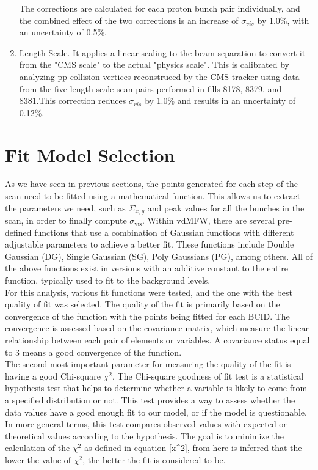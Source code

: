 \begin{enumerate}
The corrections are calculated for each proton bunch pair individually, and the combined effect of the two corrections is an increase of $\sigma_{vis}$ by 1.0\%, with an uncertainty of 0.5\%.

\item Length Scale.  It applies a linear scaling to the beam separation to convert it from the "CMS scale" to the actual "physics scale". This is  calibrated by analyzing pp collision vertices reconstruced by the CMS tracker using data from the five length scale scan pairs performed in fills 8178, 8379, and 8381.This correction reduces $\sigma_{vis}$ by 1.0\% and results in an uncertainty of 0.12\%.

\end{enumerate}

\section{Fit Model  Selection}

As we have seen in previous sections, the points generated for each step of the scan need to be fitted using a mathematical function. This allows us to extract the parameters we need, such as $\Sigma_{x,y}$ and peak values for all the bunches in the scan, in order to finally compute $\sigma_{\text{vis}}$. Within vdMFW, there are several pre-defined functions that use a combination of Gaussian functions with different adjustable parameters to achieve a better fit. These functions include Double Gaussian (DG), Single Gaussian (SG), Poly Gaussians (PG), among others. All of the above functions exist in versions with an additive constant to the entire function, typically used to fit to the background levels.\\

For this analysis, various fit functions were tested, and the one with the best quality of fit was selected. The quality of the fit is primarily based on the convergence of the function with the points being fitted for each BCID. The convergence is assessed based on the covariance matrix, which measure the linear relationship between each pair of elements or variables. A  covariance status equal to 3 means a good convergence of the function.\\ 

The second most important parameter for measuring the quality of the fit is having a good  Chi-square $\chi^2$.  The  Chi-square goodness of fit test is a statistical hypothesis test that helps to determine whether a variable is likely to come from a specified distribution or not. This test provides a way to assess whether the data values have a good enough fit to our model, or if the model is questionable. In more general terms, this test compares observed values with expected or theoretical values according to the hypothesis. The goal is to minimize the calculation of the $\chi^2$ as defined in equation \ref{x^2}, from here is  inferred that the lower the value of $\chi^2$, the better the fit is considered to be.

